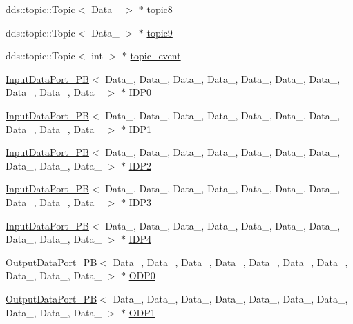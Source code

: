 \begin{DoxyCompactItemize}
\item 
dds\+::topic\+::\+Topic$<$ Data\+\_ $>$ $\ast$ \hyperlink{classProcessingBlock_a3cf71cb6cd68dc3b5a0f5c3a4201f3cf}{topic8}
\item 
dds\+::topic\+::\+Topic$<$ Data\+\_ $>$ $\ast$ \hyperlink{classProcessingBlock_a375c0e7c0702a1fdd547d3d82a417e61}{topic9}
\item 
dds\+::topic\+::\+Topic$<$ int $>$ $\ast$ \hyperlink{classProcessingBlock_ab82f4558edda184aa0519606f31c16f9}{topic\+\_\+event}
\item 
\hyperlink{classInputDataPort__PB}{Input\+Data\+Port\+\_\+\+PB}$<$ Data\+\_, Data\+\_, Data\+\_, Data\+\_, Data\+\_, Data\+\_, Data\+\_, Data\+\_, Data\+\_, Data\+\_ $>$ $\ast$ \hyperlink{classProcessingBlock_af0d2cf1939ccf6d4485565dc740b6594}{I\+D\+P0}
\item 
\hyperlink{classInputDataPort__PB}{Input\+Data\+Port\+\_\+\+PB}$<$ Data\+\_, Data\+\_, Data\+\_, Data\+\_, Data\+\_, Data\+\_, Data\+\_, Data\+\_, Data\+\_, Data\+\_ $>$ $\ast$ \hyperlink{classProcessingBlock_ae8f4351f9dbe649144e8fde43a686b02}{I\+D\+P1}
\item 
\hyperlink{classInputDataPort__PB}{Input\+Data\+Port\+\_\+\+PB}$<$ Data\+\_, Data\+\_, Data\+\_, Data\+\_, Data\+\_, Data\+\_, Data\+\_, Data\+\_, Data\+\_, Data\+\_ $>$ $\ast$ \hyperlink{classProcessingBlock_a70761edd03bbbf4541c61b6579cae2c0}{I\+D\+P2}
\item 
\hyperlink{classInputDataPort__PB}{Input\+Data\+Port\+\_\+\+PB}$<$ Data\+\_, Data\+\_, Data\+\_, Data\+\_, Data\+\_, Data\+\_, Data\+\_, Data\+\_, Data\+\_, Data\+\_ $>$ $\ast$ \hyperlink{classProcessingBlock_a59b2c2ec3fc649ddcf47750cd029222e}{I\+D\+P3}
\item 
\hyperlink{classInputDataPort__PB}{Input\+Data\+Port\+\_\+\+PB}$<$ Data\+\_, Data\+\_, Data\+\_, Data\+\_, Data\+\_, Data\+\_, Data\+\_, Data\+\_, Data\+\_, Data\+\_ $>$ $\ast$ \hyperlink{classProcessingBlock_abe3e7619f99a071be46aa27ff060fef7}{I\+D\+P4}
\item 
\hyperlink{classOutputDataPort__PB}{Output\+Data\+Port\+\_\+\+PB}$<$ Data\+\_, Data\+\_, Data\+\_, Data\+\_, Data\+\_, Data\+\_, Data\+\_, Data\+\_, Data\+\_, Data\+\_ $>$ $\ast$ \hyperlink{classProcessingBlock_aca43cbf4092036fe57cd168083dbfae1}{O\+D\+P0}
\item 
\hyperlink{classOutputDataPort__PB}{Output\+Data\+Port\+\_\+\+PB}$<$ Data\+\_, Data\+\_, Data\+\_, Data\+\_, Data\+\_, Data\+\_, Data\+\_, Data\+\_, Data\+\_, Data\+\_ $>$ $\ast$ \hyperlink{classProcessingBlock_afa89c1efafaefae506d5f1f2bff682a5}{O\+D\+P1}

\end{DoxyCompactItemize}
